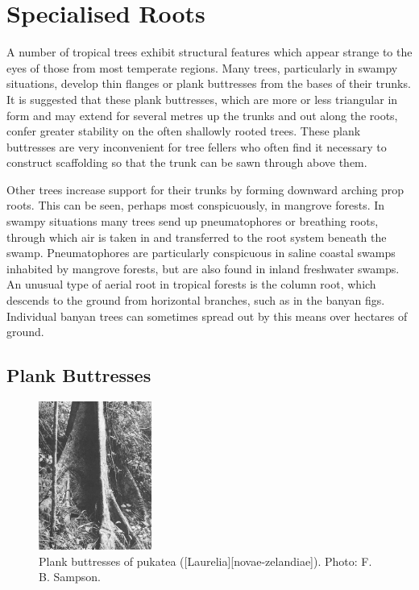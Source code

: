 \section{Specialised Roots}

A number of tropical trees exhibit structural features which appear strange to the eyes of those from most temperate regions.
Many trees, particularly in swampy situations, develop thin flanges or plank buttresses from the bases of their trunks.
It is suggested that these plank buttresses, which are more or less triangular in form and may extend for several metres up the trunks and out along the roots, confer greater stability on the often shallowly rooted trees.
These plank buttresses are very inconvenient for tree fellers who often find it necessary to construct scaffolding so that the trunk can be sawn through above them.

Other trees increase support for their trunks by forming downward arching prop roots.
This can be seen, perhaps most conspicuously, in mangrove forests.
In swampy situations many trees send up pneumatophores or breathing roots, through which air is taken in and transferred to the root system beneath the swamp.
Pneumatophores are particularly conspicuous in saline coastal swamps inhabited by mangrove forests, but are also found in inland freshwater swamps.
An unusual type of aerial root in tropical forests is the column root, which descends to the ground from horizontal branches, such as in the banyan figs.
Individual banyan trees can sometimes spread out by this means over hectares of ground.

\subsection{Plank Buttresses}

\begin{figure}
	\includegraphics[width=0.33\textwidth]{graphics/figure9buttresses.jpg}
	\centering
	\caption[Plank buttresses of pukatea]{Plank buttresses of pukatea ([Laurelia][novae-zelandiae]).
	Photo:  F. B. Sampson.}%
	\label{fig:9buttresses}
\end{figure}

